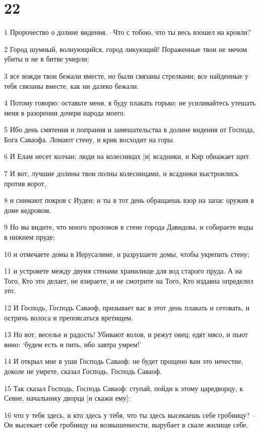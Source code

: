 \chapter{22}

\par 1 Пророчество о долине видения. --Что с тобою, что ты весь взошел на кровли?
\par 2 Город шумный, волнующийся, город ликующий! Пораженные твои не мечом убиты и не в битве умерли;
\par 3 все вожди твои бежали вместе, но были связаны стрелками; все найденные у тебя связаны вместе, как ни далеко бежали.
\par 4 Потому говорю: оставьте меня, я буду плакать горько; не усиливайтесь утешать меня в разорении дочери народа моего.
\par 5 Ибо день смятения и попрания и замешательства в долине видения от Господа, Бога Саваофа. Ломают стену, и крик восходит на горы.
\par 6 И Елам несет колчан; люди на колесницах [и] всадники, и Кир обнажает щит.
\par 7 И вот, лучшие долины твои полны колесницами, и всадники выстроились против ворот,
\par 8 и снимают покров с Иудеи; и ты в тот день обращаешь взор на запас оружия в доме кедровом.
\par 9 Но вы видите, что много проломов в стене города Давидова, и собираете воды в нижнем пруде;
\par 10 и отмечаете домы в Иерусалиме, и разрушаете домы, чтобы укрепить стену;
\par 11 и устрояете между двумя стенами хранилище для вод старого пруда. А на Того, Кто это делает, не взираете, и не смотрите на Того, Кто издавна определил это.
\par 12 И Господь, Господь Саваоф, призывает вас в этот день плакать и сетовать, и остричь волоса и препоясаться вретищем.
\par 13 Но вот, веселье и радость! Убивают волов, и режут овец; едят мясо, и пьют вино: `будем есть и пить, ибо завтра умрем!'
\par 14 И открыл мне в уши Господь Саваоф: не будет прощено вам это нечестие, доколе не умрете, сказал Господь, Господь Саваоф.
\par 15 Так сказал Господь, Господь Саваоф: ступай, пойди к этому царедворцу, к Севне, начальнику дворца [и скажи ему]:
\par 16 что у тебя здесь, и кто здесь у тебя, что ты здесь высекаешь себе гробницу? --Он высекает себе гробницу на возвышенности, вырубает в скале жилище себе.
